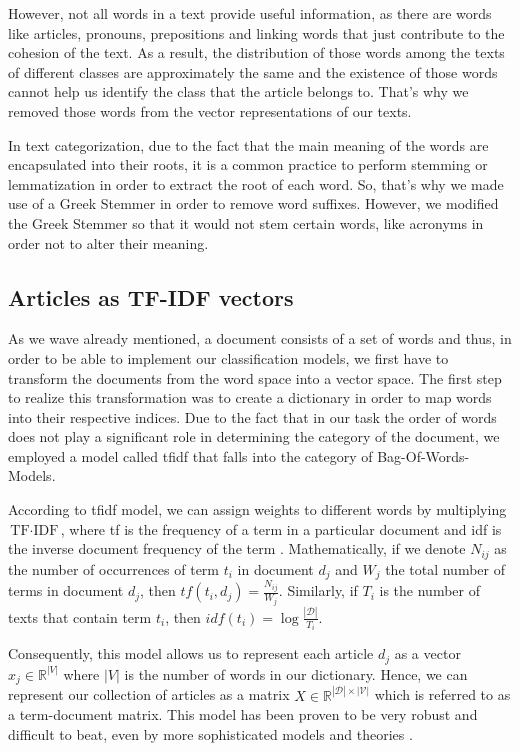 \documentclass[10pt,journal,compsoc]{IEEEtran}
\begin{document}
However, not all words in a text provide useful information,
as there are words like articles, pronouns, prepositions
and linking words that just contribute to the cohesion
of the text.
As a result, the distribution of those words among
the texts of different classes are approximately
the same and the existence of those words cannot help
us identify the class that the article belongs to.
That's why we removed those words from the vector
representations of our texts.

In text categorization, due to the fact that the
main meaning of the words are encapsulated into their
roots, it is a common practice to perform stemming or
lemmatization in order to extract the root of each word.
So, that's why we made use of a Greek Stemmer in order
to remove word suffixes.
However, we modified the Greek Stemmer so that it would
not stem certain words, like acronyms in order not to
alter their meaning. 

\subsection{Articles as TF-IDF vectors}
As we wave already mentioned, a document consists of
a set of words and thus, in order to be able to
implement our classification models, we first have
to transform the documents from the word space
into a vector space.
The first step to realize this transformation was
to create a dictionary in order to map words
into their respective indices.
Due to the fact that in our task the order of words
does not play a significant role in determining the
category of the document, we employed a model called 
tfidf that falls into the category of Bag-Of-Words-Models.
 
According to tfidf model, we can assign weights to different
words by multiplying $\text{TF}\cdot \text{IDF}$, where 
tf is the frequency of a term in a particular document and 
idf is the inverse document frequency of the term \cite{a2}.
Mathematically, if we denote $N_{ij}$ as the number of occurrences
of term $t_i$ in document $d_j$ and $W_j$ the total number
of terms in document $d_j$, then $tf(t_i,d_j) = \frac{N_{ij}}{W_j}$.
Similarly, if $T_{i}$ is the number of texts that contain term $t_i$,
then $idf(t_i) = \log\frac{|\mathcal{D}|}{T_{i}}$.

Consequently, this model allows us to represent each
article $d_j$ as a vector $x_j\in\mathbb{R}^{|V|}$ 
where $|V|$ is the number of words in our dictionary.
Hence, we can represent our collection of articles as
a matrix $X\in \mathbb{R}^{|\mathcal{D}|\times |\mathcal{V}|}$
which is referred to as a term-document matrix.
This model has been proven to be very robust and difficult
to beat, even by more sophisticated models and theories \cite{a2}.
\end{document}
